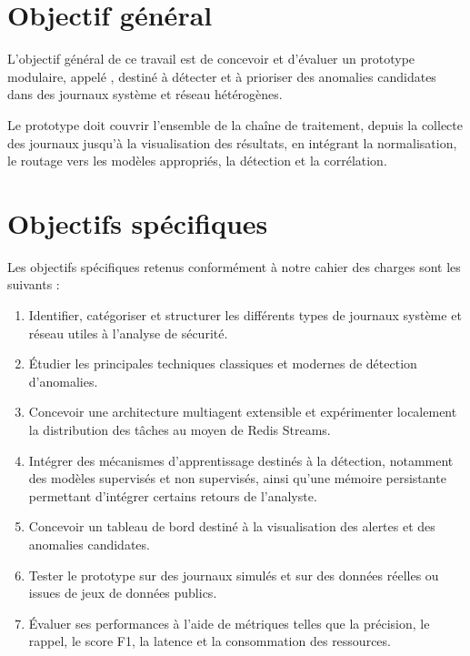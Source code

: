 \section{Objectif général}

L'objectif général de ce travail est de concevoir et d'évaluer un prototype modulaire, appelé \logminer{}, destiné à détecter et à prioriser des anomalies candidates dans des journaux système et réseau hétérogènes.

Le prototype doit couvrir l'ensemble de la chaîne de traitement, depuis la collecte des journaux jusqu'à la visualisation des résultats, en intégrant la normalisation, le routage vers les modèles appropriés, la détection et la corrélation.

\section{Objectifs spécifiques}

Les objectifs spécifiques retenus conformément à notre cahier des charges sont les suivants :

\begin{enumerate}

\item Identifier, catégoriser et structurer les différents types de journaux système et réseau utiles à l'analyse de sécurité.

\item Étudier les principales techniques classiques et modernes de détection d'anomalies.

\item Concevoir une architecture multiagent extensible et expérimenter localement la distribution des tâches au moyen de Redis Streams.

\item Intégrer des mécanismes d'apprentissage destinés à la détection, notamment des modèles supervisés et non supervisés, ainsi qu'une mémoire persistante permettant d'intégrer certains retours de l'analyste.

\item Concevoir un tableau de bord destiné à la visualisation des alertes et des anomalies candidates.

\item Tester le prototype sur des journaux simulés et sur des données réelles ou issues de jeux de données publics.

\item Évaluer ses performances à l'aide de métriques telles que la précision, le rappel, le score F1, la latence et la consommation des ressources.

\end{enumerate}

